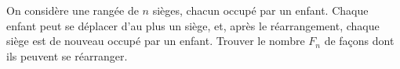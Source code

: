 On considère une rangée de $n$ sièges, chacun occupé par un enfant. Chaque enfant peut se déplacer d'au plus un siège, et, après le réarrangement, chaque siège est de nouveau occupé par un enfant. Trouver le nombre $F_n$ de façons dont ils peuvent se réarranger.
